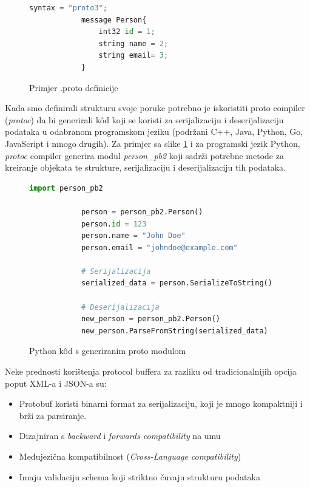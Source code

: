 \documentclass[zavrsnirad]{fer}
\begin{document}
\begin{figure}[H]
	\centering
	\begin{minipage}{0.6\linewidth}
		\begin{lstlisting}[language=Python]
			syntax = "proto3";
			message Person{
				int32 id = 1;
				string name = 2;
				string email= 3;
			}
		\end{lstlisting}
	\end{minipage}
	\caption{Primjer .proto definicije}
	\label{slk:proto}
\end{figure}
\newpage		
	Kada smo definirali strukturu svoje poruke potrebno je iskoristiti proto compiler (\textit{protoc}) da bi generirali k\^od koji se koristi za serijalizaciju i deserijalizaciju podataka u odabranom programskom jeziku (podržani C++, Java, Python, Go, JavaScript i mnogo drugih). Za primjer sa slike \ref{slk:proto} i za programski jezik Python, \textit{protoc} compiler generira modul \textit{person\_pb2} koji sadrži potrebne metode za kreiranje objekata te strukture, serijalizaciju i deserijalizaciju tih podataka. 

\begin{figure}[H]
	\centering
	\begin{minipage}{0.8\linewidth}
		\begin{lstlisting}[language=Python]
			import person_pb2
			
			person = person_pb2.Person()
			person.id = 123
			person.name = "John Doe"
			person.email = "johndoe@example.com"
			
			# Serijalizacija
			serialized_data = person.SerializeToString()
			
			# Deserijalizacija
			new_person = person_pb2.Person()
			new_person.ParseFromString(serialized_data)
		\end{lstlisting}
	\end{minipage}
	\caption{Python k\^od s generiranim proto modulom}
	\label{slk:proto_kod}
\end{figure}

Neke prednosti korištenja protocol buffera za razliku od tradicionalnijih opcija poput XML-a i JSON-a su:

\begin{itemize}
	\item Protobuf koristi binarni format za serijalizaciju, koji je mnogo kompaktniji i brži za parsiranje.
	\item Dizajniran s \textit{backward} i \textit{forwards compatibility} na umu 
	\item Međujezična kompatibilnost (\textit{Cross-Language compatibility})
	\item Imaju validaciju schema koji striktno čuvaju strukturu podataka
\end{itemize}
\end{document}
